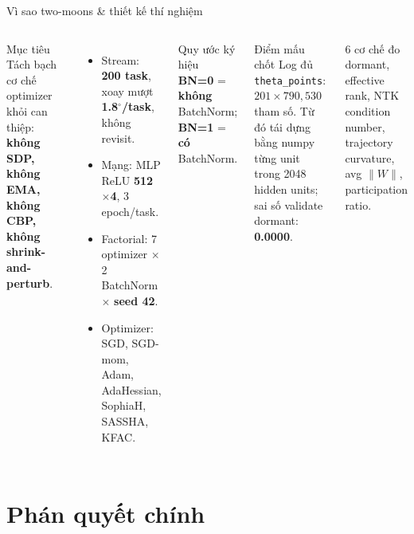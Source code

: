 \documentclass[8pt,aspectratio=169]{beamer}
\newcommand{\hl}[1]{\textcolor{accent}{\textbf{#1}}}
\begin{document}
\begin{frame}{Vì sao two-moons \& thiết kế thí nghiệm}
\begin{columns}[T]
\begin{block}{Mục tiêu}
Tách bạch cơ chế optimizer khỏi can thiệp: \textbf{không SDP, không EMA, không CBP, không shrink-and-perturb}.
\end{block}

\begin{itemize}\small
\item Stream: \hl{200 task}, xoay mượt \hl{1.8$^\circ$/task}, không revisit.
\item Mạng: MLP ReLU \hl{512$\times$4}, 3 epoch/task.
\item Factorial: 7 optimizer $\times$ 2 BatchNorm $\times$ \hl{seed 42}.
\item Optimizer: SGD, SGD-mom, Adam, AdaHessian, SophiaH, SASSHA, KFAC.
\end{itemize}

\begin{block}{Quy ước ký hiệu}
\small \textbf{BN=0} = \textbf{không} BatchNorm; \quad \textbf{BN=1} = \textbf{có} BatchNorm.
\end{block}

\begin{exampleblock}{Điểm mấu chốt}
Log đủ \texttt{theta\_points}: $201\times790{,}530$ tham số. Từ đó tái dựng bằng numpy từng unit trong 2048 hidden units; sai số validate dormant: \hl{0.0000}.
\end{exampleblock}

\begin{block}{6 cơ chế đo}
\small dormant, effective rank, NTK condition number, trajectory curvature, avg $\|W\|$, participation ratio.
\end{block}
\end{columns}
\end{frame}

\section{Phán quyết chính}
\end{document}
